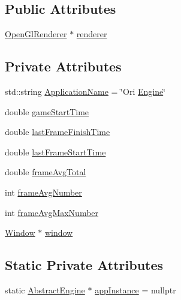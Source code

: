\subsection*{Public Attributes}
\begin{DoxyCompactItemize}
\item 
\hyperlink{class_ori_engine_1_1_open_gl_renderer}{Open\+Gl\+Renderer} $\ast$ \hyperlink{class_ori_engine_1_1_abstract_engine_ab1a0fbe17c1ddf528a9863b8b3e19d41}{renderer}
\end{DoxyCompactItemize}
\subsection*{Private Attributes}
\begin{DoxyCompactItemize}
\item 
std\+::string \hyperlink{class_ori_engine_1_1_abstract_engine_a0d5405beaacf6c596046a66986e7573a}{Application\+Name} = \char`\"{}Ori \hyperlink{_skeletal_engine_8cpp_a67e670c1f33b20215b3721b4a515deb2}{Engine}\char`\"{}
\item 
double \hyperlink{class_ori_engine_1_1_abstract_engine_a34aa336df066d8c50363cf6260fcd268}{game\+Start\+Time}
\item 
double \hyperlink{class_ori_engine_1_1_abstract_engine_a8b839c3500a3156be543f1119f280a81}{last\+Frame\+Finish\+Time}
\item 
double \hyperlink{class_ori_engine_1_1_abstract_engine_a28d43c329a702901905e6b2aee2f23f7}{last\+Frame\+Start\+Time}
\item 
double \hyperlink{class_ori_engine_1_1_abstract_engine_a98601d59527aa41d264c07ec6cfb3fde}{frame\+Avg\+Total}
\item 
int \hyperlink{class_ori_engine_1_1_abstract_engine_a878214e5c90997da1b783cd14eb19c6e}{frame\+Avg\+Number}
\item 
int \hyperlink{class_ori_engine_1_1_abstract_engine_ad6ff48352c89ad50432a017a167dd860}{frame\+Avg\+Max\+Number}
\item 
\hyperlink{class_ori_engine_1_1_window}{Window} $\ast$ \hyperlink{class_ori_engine_1_1_abstract_engine_a19fb6e3400090763c2459f7ee412ca14}{window}
\end{DoxyCompactItemize}
\subsection*{Static Private Attributes}
\begin{DoxyCompactItemize}
\item 
static \hyperlink{class_ori_engine_1_1_abstract_engine}{Abstract\+Engine} $\ast$ \hyperlink{class_ori_engine_1_1_abstract_engine_a2a20dacf864ea1a8136e7531fa901932}{app\+Instance} = nullptr
\end{DoxyCompactItemize}


